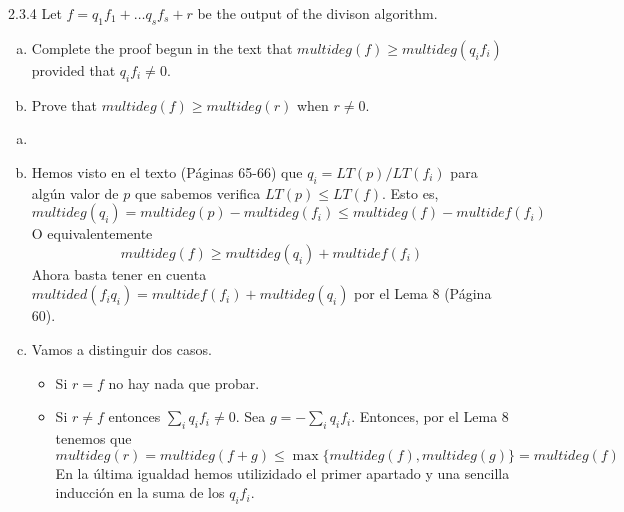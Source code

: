 \documentclass[twoside]{article}
\begin{document}
\begin{ejercicio}{2.3.4}
Let $f = q_1 f_1 + \dots q_s f_s + r$ be the output of the divison algorithm.
\begin{enumerate}[a.]
\item Complete the proof begun in the text that $multideg(f) ≥ multideg(q_i f_i)$ provided that $q_i f_i \neq 0$.
\item Prove that $multideg(f) ≥ multideg(r)$ when $r \neq 0$.
\end{enumerate}
\begin{solucion}
\begin{enumerate}[a.]
\item[]
\item Hemos visto en el texto (Páginas 65-66) que $q_i =LT(p)/LT(f_i)$ para algún valor de $p$ que sabemos verifica $LT(p)\leq LT(f)$. Esto es, $$multideg(q_i) = multideg(p)-multideg(f_i) \leq multideg(f)-multidef(f_i)$$ 
O equivalentemente
$$multideg(f) \geq multideg(q_i)+multidef(f_i)$$
Ahora basta tener en cuenta $multided(f_iq_i) = multidef(f_i)+multideg(q_i)$ por el Lema 8 (Página 60).
\item Vamos a distinguir dos casos. 
\begin{itemize}
\item Si $r=f$ no hay nada que probar.
\item Si $r\neq f$ entonces $\sum_i q_i f_i \neq 0$. Sea $g=-\sum_i q_i f_i$. Entonces, por el Lema 8 tenemos que
$$
multideg(r)=multideg(f+g) \leq \max{\{multideg(f),multideg(g)\}}=multideg(f)
$$
En la última igualdad hemos utilizidado el primer apartado y una sencilla inducción en la suma de los $q_if_i$.

\end{itemize}

\end{enumerate}
\end{solucion}
\end{ejercicio}

\newpage
\end{document}
